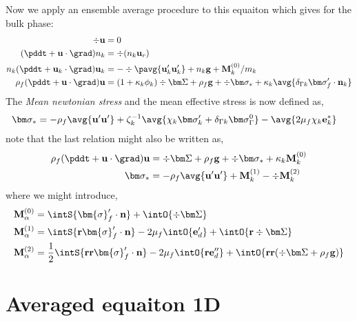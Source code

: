 Now we apply an ensemble average procedure to this equaiton which gives for the bulk phase: 
\begin{align*}
    \div \textbf{u} &= 0\\
     (\pddt + \textbf{u} \cdot \grad) n_k &= \div (n_k \textbf{u}_r)\\
    n_k  (\pddt + \textbf{u}_k \cdot \grad) \textbf{u}_k &= 
    - \div \pavg{\textbf{u}_k'\textbf{u}_k'}+n_k \textbf{g}
    +\textbf{M}_k^{(0)}/m_k\\
    \rho_f (\pddt + \textbf{u} \cdot \grad)\textbf{u}
    &= 
    (1 + \kappa_k \phi_k)\div\bm\Sigma
    + \rho_f \textbf{g}
    + \div \bm\sigma_*
    +\kappa_k  \avg{\delta_{\Gamma k} \bm\sigma_f' \cdot \textbf{n}_k} 
\end{align*}
The \textit{Mean newtonian stress} and the mean effective stress is now defined as, 
\begin{align}
    \bm\sigma_* &= 
    - \rho_f \avg{\textbf{u}'\textbf{u}'}
    +\zeta_k^{-1} \avg{\chi_k \bm\sigma_k' + \delta_{\Gamma k} \bm\sigma_\Gamma^0} 
    - \avg{2\mu_f \chi_k \textbf{e}_k^*}
\end{align}
note that the last relation might also be written as, 
\begin{align}
    \rho_f (\pddt + \textbf{u} \cdot \grad)\textbf{u}
    &= 
    \div\bm\Sigma
    + \rho_f \textbf{g}
    + \div \bm\sigma_*
    +\kappa_k  \textbf{M}_k^{(0)}\\
    \bm\sigma_* &= 
    - \rho_f \avg{\textbf{u}'\textbf{u}'}
    + \textbf{M}_k^{(1)}
    -\div \textbf{M}_k^{(2)}
\end{align}
where we might introduce,
\begin{align}
    \textbf{M}_\alpha^{(0)} &=
    \intS{\bm{\sigma}_f' \cdot \textbf{n}}
   +\intO{\div \bm\Sigma}
   \\
   \textbf{M}_\alpha^{(1)} &=
   \intS{\textbf{r}\bm{\sigma}_f' \cdot \textbf{n}}
   -2\mu_f \intO{\textbf{e}_d'}
   +\intO{\textbf{r}\div \bm\Sigma}
   \\
   \textbf{M}_\alpha^{(2)} &=
   \frac{1}{2}\intS{\textbf{rr}\bm{\sigma}_f' \cdot \textbf{n}}
   -2\mu_f \intO{\textbf{re}_d''}
   +\intO{\textbf{rr}(\div \bm\Sigma+ \rho_f\textbf{g})}
    \\
\end{align}

\section{Averaged equaiton 1D}
